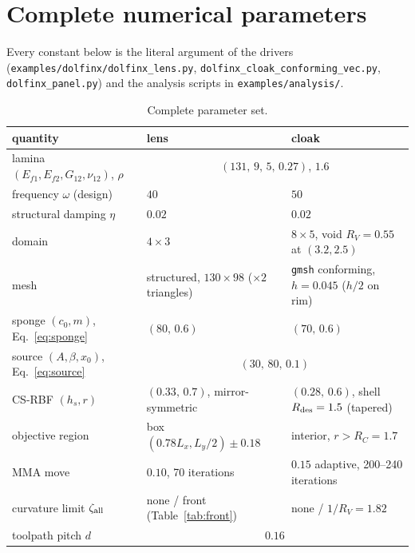 \section{Complete numerical parameters}\label{app:params}
Every constant below is the literal argument of the drivers
(\texttt{examples/\allowbreak dolfinx/\allowbreak dolfinx\_\allowbreak lens.py}, \texttt{dolfinx\_\allowbreak cloak\_\allowbreak conforming\_\allowbreak vec.py},
\texttt{dolfinx\_\allowbreak panel.py}) and the analysis scripts in \texttt{examples/\allowbreak analysis/}.
\begin{table}[!tbp]
\centering\small
\caption{Complete parameter set.}\label{tab:params}
\setlength{\tabcolsep}{4pt}
\begin{tabular}{@{}lll@{}}
\toprule
quantity & lens & cloak \\ \midrule
lamina $(E_{f1},E_{f2},G_{12},\nu_{12})$, $\rho$ & \multicolumn{2}{c}{$(131,\,9,\,5,\,0.27)$, $1.6$}\\
frequency $\omega$ (design) & $40$ & $50$\\
structural damping $\eta$ & $0.02$ & $0.02$\\
domain & $4\times3$ & $8\times5$, void $R_V=0.55$ at $(3.2,2.5)$\\
mesh & structured, $130\times98$ ($\times2$ triangles) & \texttt{gmsh} conforming, $h=0.045$ ($h/2$ on rim)\\
sponge $(c_0,m)$, Eq.~\eqref{eq:sponge} & $(80,\,0.6)$ & $(70,\,0.6)$\\
source $(A,\beta,x_0)$, Eq.~\eqref{eq:source} & \multicolumn{2}{c}{$(30,\,80,\,0.1)$}\\
CS-RBF $(h_s,r)$ & $(0.33,\,0.7)$, mirror-symmetric & $(0.28,\,0.6)$, shell $R_{\rm des}=1.5$ (tapered)\\
objective region & box $(0.78L_x,L_y/2)\pm0.18$ & interior, $r>R_C=1.7$\\
MMA move & $0.10$, 70 iterations & $0.15$ adaptive, 200--240 iterations\\
curvature limit $\zeta_{\rm all}$ & none / front (Table~\ref{tab:front}) & none / $1/R_V=1.82$\\
toolpath pitch $d$ & \multicolumn{2}{c}{$0.16$}\\
\bottomrule
\end{tabular}
\end{table}

